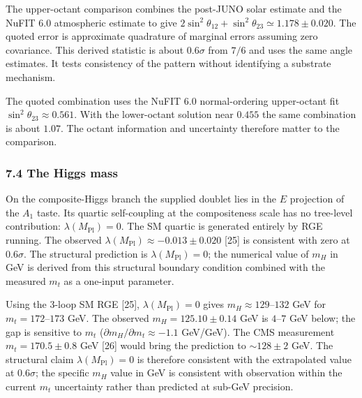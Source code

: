 \documentclass[
]{article}
\begin{document}
The upper-octant comparison combines the post-JUNO solar estimate and
the NuFIT 6.0 atmospheric estimate to give
\(2\sin^2\theta_{12}+\sin^2\theta_{23}\simeq 1.178\pm0.020\). The quoted
error is approximate quadrature of marginal errors assuming zero
covariance. This derived statistic is about \(0.6\sigma\) from \(7/6\)
and uses the same angle estimates. It tests consistency of the pattern
without identifying a substrate mechanism.

The quoted combination uses the NuFIT 6.0 normal-ordering upper-octant
fit \(\sin^2\theta_{23}\approx0.561\). With the lower-octant solution
near \(0.455\) the same combination is about \(1.07\). The octant
information and uncertainty therefore matter to the comparison.

\hypertarget{the-higgs-mass}{%
\subsubsection{7.4 The Higgs mass}\label{the-higgs-mass}}

On the composite-Higgs branch the supplied doublet lies in the \(E\)
projection of the \(A_1\) taste. Its quartic self-coupling at the
compositeness scale has no tree-level contribution:
\(\lambda(M_{\text{Pl}}) = 0\). The SM quartic is generated entirely by
RGE running. The observed
\(\lambda(M_{\text{Pl}}) \approx -0.013 \pm 0.020\) {[}25{]} is
consistent with zero at \(0.6\sigma\). The structural prediction is
\(\lambda(M_{\text{Pl}}) = 0\); the numerical value of \(m_H\) in GeV is
derived from this structural boundary condition combined with the
measured \(m_t\) as a one-input parameter.

Using the 3-loop SM RGE {[}25{]}, \(\lambda(M_{\text{Pl}}) = 0\) gives
\(m_H \approx 129\)--\(132\) GeV for \(m_t = 172\)--\(173\) GeV. The
observed \(m_H = 125.10 \pm 0.14\) GeV is \(4\)--\(7\) GeV below; the
gap is sensitive to \(m_t\) (\(\partial m_H/\partial m_t \approx -1.1\)
GeV/GeV). The CMS measurement \(m_t = 170.5 \pm 0.8\) GeV {[}26{]} would
bring the prediction to \(\sim 128 \pm 2\) GeV. The structural claim
\(\lambda(M_{\text{Pl}}) = 0\) is therefore consistent with the
extrapolated value at \(0.6\sigma\); the specific \(m_H\) value in GeV
is consistent with observation within the current \(m_t\) uncertainty
rather than predicted at sub-GeV precision.
\end{document}
